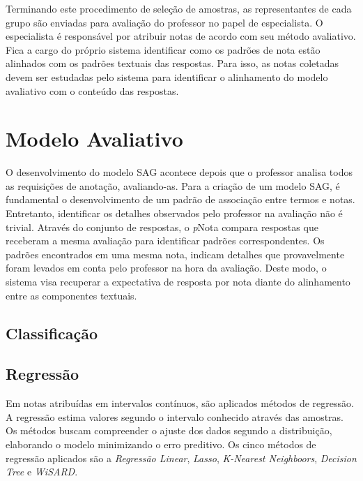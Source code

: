 Terminando este procedimento de seleção de amostras, as representantes de cada grupo são enviadas para avaliação do professor no papel de especialista. O especialista é responsável por atribuir notas de acordo com seu método avaliativo. Fica a cargo do próprio sistema identificar como os padrões de nota estão alinhados com os padrões textuais das respostas. Para isso, as notas coletadas devem ser estudadas pelo sistema para identificar o alinhamento do modelo avaliativo com o conteúdo das respostas.

\section{Modelo Avaliativo}

 O desenvolvimento do modelo SAG acontece depois que o professor analisa todos as requisições de anotação, avaliando-as. Para a criação de um modelo SAG, é fundamental o desenvolvimento de um padrão de associação entre termos e notas. Entretanto, identificar os detalhes observados pelo professor na avaliação não é trivial. Através do conjunto de respostas, o \textit{p}Nota compara respostas que receberam a mesma avaliação para identificar padrões correspondentes. Os padrões encontrados em uma mesma nota, indicam detalhes que provavelmente foram levados em conta pelo professor na hora da avaliação. Deste modo, o sistema visa recuperar a expectativa de resposta por nota diante do alinhamento entre as componentes textuais.

\begin{comment}

Para reconhecimento de padrões, combinamos três modelos de notas com a avaliação automática. Em notas discretas e graduais utilizamos algoritmos de classificação. Enquanto isso, em notas contínuas usamos algoritmos de regressão. Em ambos os casos, os métodos aplicam aprendizado supervisionado, treinando através das notas dadas pelo professor os algoritmos.
\end{comment}

\subsection{Classificação}

\subsection{Regressão}

Em notas atribuídas em intervalos contínuos, são aplicados métodos de regressão. A regressão estima valores segundo o intervalo conhecido através das amostras. Os métodos buscam compreender o ajuste dos dados segundo a distribuição, elaborando o modelo minimizando o erro preditivo. Os cinco métodos de regressão aplicados são a \textit{Regressão Linear}, \textit{Lasso}, \textit{K-Nearest Neighboors}, \textit{Decision Tree} e \textit{WiSARD}.

